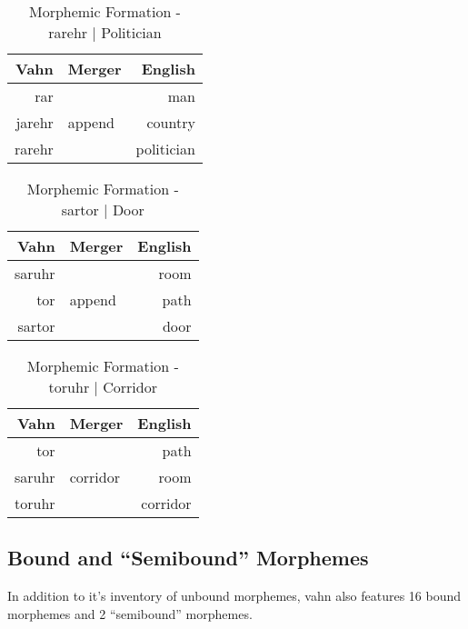 \documentclass{article}
\begin{document}
\begin{table}[H]
\centering
\begin{tabular}{r|l||r}
Vahn     & Merger & English  \\
\hline\hline
rar &       & man      \\
jarehr & append  & country    \\
\hline \hline
rarehr &        & politician \\
\end{tabular}
\caption{Morphemic Formation - rarehr | Politician}
\label{Morphemic Formation - rarehr | Politician}
\end{table}

\begin{table}[H]
\centering
\begin{tabular}{r|l||r}
Vahn     & Merger & English  \\
\hline\hline
saruhr &       & room\\
tor & append  & path \\
\hline \hline
sartor &        & door \\
\end{tabular}
\caption{Morphemic Formation - sartor | Door}
\label{Morphemic Formation - sartor | Door}
\end{table}

\begin{table}[H]
\centering
\begin{tabular}{r|l||r}
Vahn     & Merger & English  \\
\hline\hline
tor &       &  path\\
saruhr & corridor & room \\
\hline \hline
toruhr &        & corridor\\
\end{tabular}
\caption{Morphemic Formation - toruhr | Corridor}
\label{Morphemic Formation - toruhr | Corridor}
\end{table}

\subsection{Bound and ``Semibound'' Morphemes}

In addition to it's inventory of unbound morphemes, vahn also features 16 bound morphemes and 2 ``semibound'' morphemes.
\end{document}
